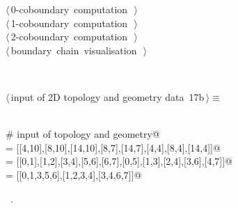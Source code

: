 \documentclass[11pt,oneside]{article}	%
\begin{document}
\begin{flushleft}
\begin{minipage}{\linewidth}
\begin{list}{}{}
\mbox{}\verb@@\hbox{$\langle\,$0-coboundary computation\nobreak\ {\footnotesize {}}$\,\rangle$}\verb@@\\
\mbox{}\verb@@\hbox{$\langle\,$1-coboundary computation\nobreak\ {\footnotesize {}}$\,\rangle$}\verb@@\\
\mbox{}\verb@@\hbox{$\langle\,$2-coboundary computation\nobreak\ {\footnotesize {}}$\,\rangle$}\verb@@\\
\mbox{}\verb@@\hbox{$\langle\,$boundary chain visualisation\nobreak\ {\footnotesize {}}$\,\rangle$}\verb@@\\
\mbox{}\verb@@{\NWsep}
\end{list}
\vspace{-2ex}
\end{minipage}\\[4ex]
\end{flushleft}

\begin{flushleft} \small
\begin{minipage}{\linewidth} \label{scrap33}
\protect{}$\langle\,$input of 2D topology and geometry data\nobreak\ {\footnotesize 17b}$\,\rangle\equiv$
\vspace{-1ex}
\begin{list}{}{} \item
\mbox{}\verb@@\\
\mbox{}\verb@# input of topology and geometry@\\
\mbox{} = [[4,10],[8,10],[14,10],[8,7],[14,7],[4,4],[8,4],[14,4]]@\\
\mbox{}\verb@EV = [[0,1],[1,2],[3,4],[5,6],[6,7],[0,5],[1,3],[2,4],[3,6],[4,7]]@\\
\mbox{}\verb@FV = [[0,1,3,5,6],[1,2,3,4],[3,4,6,7]]@\\
\mbox{}\verb@@{\NWsep}
\end{list}
\vspace{-1ex}
\footnotesize\addtolength{\baselineskip}{-1ex}
\begin{list}{}{\setlength{\itemsep}{-\parsep}\setlength{\itemindent}{-\leftmargin}}
\item \NWtxtMacroRefIn\ .
\end{list}
\end{minipage}\\[4ex]
\end{flushleft}
\end{document}
